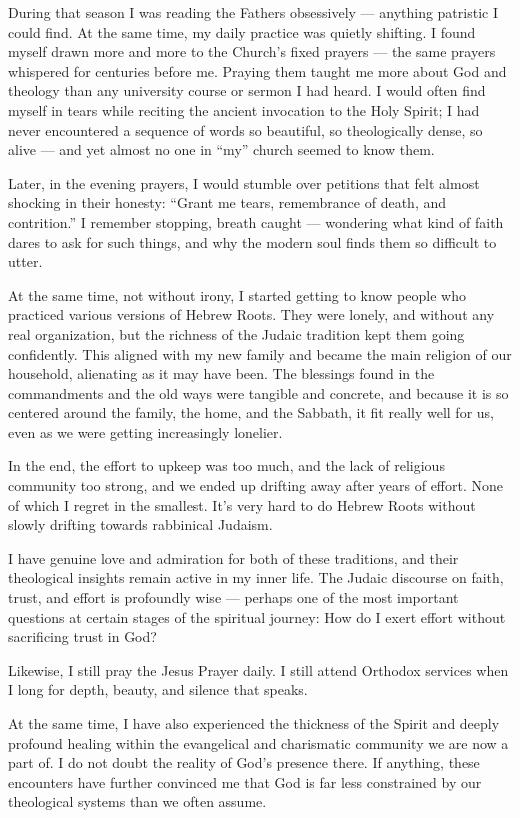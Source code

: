 \documentclass[10pt,twoside,openany]{book}
\begin{document}
During that season I was reading the Fathers obsessively --- anything
patristic I could find. At the same time, my daily practice was
quietly shifting. I found myself drawn more and more to the Church's
fixed prayers --- the same prayers whispered for centuries before me.
Praying them taught me more about God and theology than any university
course or sermon I had heard. I would often find myself in tears while
reciting the ancient invocation to the Holy Spirit; I had never
encountered a sequence of words so beautiful, so theologically dense,
so alive --- and yet almost no one in ``my'' church seemed to know them.

Later, in the evening prayers, I would stumble over petitions that
felt almost shocking in their honesty: ``Grant me tears, remembrance of
death, and contrition.'' I remember stopping, breath caught ---
wondering what kind of faith dares to ask for such things, and why the
modern soul finds them so difficult to utter.

At the same time, not without irony, I started getting to know people
who practiced various versions of Hebrew Roots. They were lonely, and
without any real organization, but the richness of the Judaic tradition
kept them going confidently. This aligned with my new family and became
the main religion of our household, alienating as it may have been. The
blessings found in the commandments and the old ways were tangible and
concrete, and because it is so centered around the family, the home,
and the Sabbath, it fit really well for us, even as we were getting
increasingly lonelier.

In the end, the effort to upkeep was too much, and the lack of
religious community too strong, and we ended up drifting away after
years of effort. None of which I regret in the smallest. It's very hard
to do Hebrew Roots without slowly drifting towards rabbinical Judaism.

I have genuine love and admiration for both of these traditions, and
their theological insights remain active in my inner life. The Judaic
discourse on faith, trust, and effort is profoundly wise --- perhaps one
of the most important questions at certain stages of the spiritual
journey: How do I exert effort without sacrificing trust in God?

Likewise, I still pray the Jesus Prayer daily. I still attend Orthodox
services when I long for depth, beauty, and silence that speaks.

At the same time, I have also experienced the thickness of the Spirit
and deeply profound healing within the evangelical and charismatic
community we are now a part of. I do not doubt the reality of God's
presence there. If anything, these encounters have further convinced me
that God is far less constrained by our theological systems than we
often assume.
\end{document}

